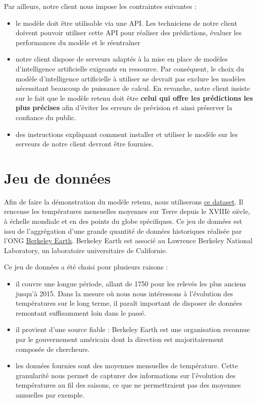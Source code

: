 \documentclass[french]{article}
\begin{document}
    Par ailleurs, notre client nous impose les contraintes suivantes :
    \begin{itemize}
        \item le modèle doit être utilisable via une API. Les techniciens de notre client doivent pouvoir utiliser cette API pour réaliser des prédictions, évaluer les performances du modèle et le réentraîner
        \item notre client dispose de serveurs adaptés à la mise en place de modèles d'intelligence artificielle exigeants en ressource. Par conséquent, le choix du modèle d'intelligence artificielle à utiliser ne devrait pas exclure les modèles nécessitant beaucoup de puissance de calcul. En revanche, notre client insiste sur le fait que le modèle retenu doit être \textbf{celui qui offre les prédictions les plus précises} afin d'éviter les erreurs de prévision et ainsi préserver la confiance du public.
        \item des instructions expliquant comment installer et utiliser le modèle sur les serveurs de notre client devront être fournies.
    \end{itemize}

    \section{Jeu de données}
    
    Afin de faire la démonstration du modèle retenu, nous utiliserons \href{https://www.kaggle.com/datasets/berkeleyearth/climate-change-earth-surface-temperature-data}{ce dataset}. Il rencense les températures mensuelles moyennes sur Terre depuis le XVIIIè siècle, à échelle mondiale et en des points du globe spécifiques. Ce jeu de données est issu de l'aggrégation d'une grande quantité de données historiques réalisée par l'ONG \href{http://berkeleyearth.org/about/}{Berkeley Earth}. Berkeley Earth est associé au Lawrence Berkeley National Laboratory, un laboratoire universitaire de Californie.

    Ce jeu de données a été choisi pour plusieurs raisons :
    \begin{itemize}
        \item il couvre une longue période, allant de 1750 pour les relevés les plus anciens jusqu'à 2015. Dans la mesure où nous nous intéressons à l'évolution des températures sur le long terme, il paraît important de disposer de données remontant suffisamment loin dans le passé.
        \item il provient d'une source fiable : Berkeley Earth est une organisation reconnue par le gouvernement américain dont la direction est majoritairement composée de chercheurs.
        \item les données fournies sont des moyennes mensuelles de température. Cette granularité nous permet de capturer des informations sur l'évolution des températures au fil des saisons, ce que ne permettraient pas des moyennes annuelles par exemple.
    \end{itemize}
    
\end{document}
